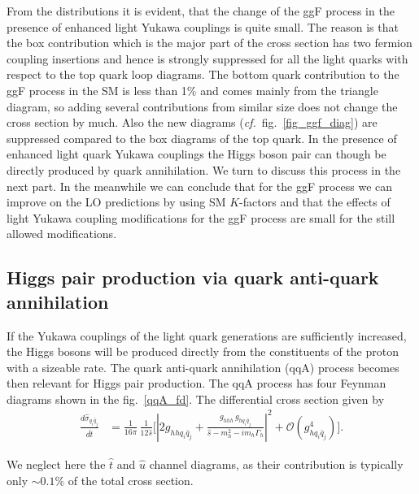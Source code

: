 From the distributions it is evident, that the change of the ggF process in the presence of enhanced light Yukawa couplings is quite small. The reason is that the box contribution which is the major part of the cross section has two fermion coupling insertions and hence is strongly suppressed for all the light quarks with respect to the top quark loop diagrams. The bottom quark contribution to the ggF process in the SM is less than 1\% and comes mainly from the triangle diagram, so adding several contributions from similar size does not change the cross section by much. Also the new diagrams (\textit{cf.}~fig.~\ref{fig_ggf_diag}) are suppressed compared to the box diagrams of the top quark.
In the presence of enhanced light quark Yukawa couplings the Higgs boson pair can though be directly produced by quark annihilation. We turn to discuss this process in the next part. In the meanwhile we can conclude that for the ggF process we can improve on the LO predictions by using SM $K$-factors and that the effects of light Yukawa coupling modifications for the ggF process are small for the still allowed modifications.
\subsection{Higgs pair production via quark anti-quark annihilation}
If the Yukawa couplings of the light quark generations are sufficiently increased, the Higgs bosons will be produced directly from the constituents of the proton with a sizeable rate. The quark anti-quark annihilation (qqA) process becomes then relevant for Higgs pair production.
The qqA process has four Feynman diagrams shown in the fig.~\ref{qqA_fd}.
The differential cross section given by
\begin{align}
	\frac{d \hat \sigma_{q_i\bar{q}_j}}{d \hat t} &= \frac{1}{16 \pi}\, \frac{1}{12  \hat{s}} \bigg[ \left| 2  g_{hh q_i \bar q_j} + \frac{g_{hhh}\, g_{h q_i \bar q_j}}{\hat{s}-m_h^2-im_h\Gamma_h}\right|^2+ \mathcal{O}(g_{h q_i \bar q_j}^4) \bigg].
	\label{sigmaqqa}
\end{align}

We neglect here the $\hat{t}$ and $\hat{u}$ channel diagrams, as their contribution is typically only $\sim 0.1 \%$ of the total cross section.

